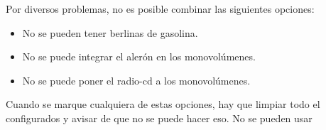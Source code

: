 \documentclass[letterpaper,10pt,spanish]{sphinxmanual}
\begin{document}
Por diversos problemas, no es posible combinar las siguientes opciones:
\begin{itemize}
\item {} 
No se pueden tener berlinas de gasolina.

\item {} 
No se puede integrar el alerón en los monovolúmenes.

\item {} 
No se puede poner el radio-cd a los monovolúmenes.

\end{itemize}

Cuando se marque cualquiera de estas opciones, hay que limpiar todo el configurados y avisar de que no se puede hacer eso. No se pueden usar 

\begin{sphinxVerbatim}[commandchars=\\\{\}]
 \PYG{p}{[}  
                   \PYG{p}{]}
 \PYG{p}{[}  
                   \PYG{p}{]}

 

            
                 \PYG{p}{[}\PYG{p}{]}
                   


\end{sphinxVerbatim}
\end{document}
